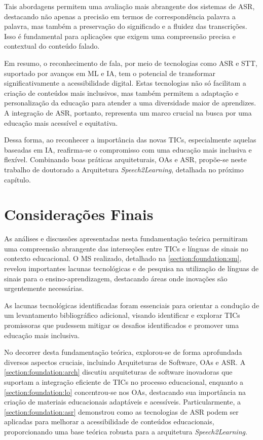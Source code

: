 Tais abordagens permitem uma avaliação mais abrangente dos sistemas de ASR, destacando não apenas a precisão em termos de correspondência palavra a palavra, mas também a preservação do significado e a fluidez das transcrições. Isso é fundamental para aplicações que exigem uma compreensão precisa e contextual do conteúdo falado.

Em resumo, o reconhecimento de fala, por meio de tecnologias como ASR e STT, suportado por avanços em ML e IA, tem o potencial de transformar significativamente a acessibilidade digital. Estas tecnologias não só facilitam a criação de conteúdos mais inclusivos, mas também permitem a adaptação e personalização da educação para atender a uma diversidade maior de aprendizes. A integração de ASR, portanto, representa um marco crucial na busca por uma educação mais acessível e equitativa.

Dessa forma, ao reconhecer a importância das novas TICs, especialmente aquelas baseadas em IA, reafirma-se o compromisso com uma educação mais inclusiva e flexível. Combinando boas práticas arquiteturais, OAs e ASR, propõe-se neste trabalho de doutorado a Arquitetura \textit{Speech2Learning}, detalhada no próximo capítulo.

\section{Considerações Finais}

As análises e discussões apresentadas nesta fundamentação teórica permitiram uma compreensão abrangente das interseções entre TICs e línguas de sinais no contexto educacional. O MS realizado, detalhado na \autoref{section:foundation:sm}, revelou importantes lacunas tecnológicas e de pesquisa na utilização de línguas de sinais para o ensino-aprendizagem, destacando áreas onde inovações são urgentemente necessárias. 

As lacunas tecnológicas identificadas foram essenciais para orientar a condução de um levantamento bibliográfico adicional, visando identificar e explorar TICs promissoras que pudessem mitigar os desafios identificados e promover uma educação mais inclusiva.

No decorrer desta fundamentação teórica, explorou-se de forma aprofundada diversos aspectos cruciais, incluindo Arquiteturas de Software, OAs e ASR. A \autoref{section:foundation:arch} discutiu arquiteturas de software inovadoras que suportam a integração eficiente de TICs no processo educacional, enquanto a \autoref{section:foundation:lo} concentrou-se nos OAs, destacando sua importância na criação de materiais educacionais adaptáveis e acessíveis. Particularmente, a \autoref{section:foundation:asr} demonstrou como as tecnologias de ASR podem ser aplicadas para melhorar a acessibilidade de conteúdos educacionais, proporcionando uma base teórica robusta para a arquitetura \textit{Speech2Learning}.

